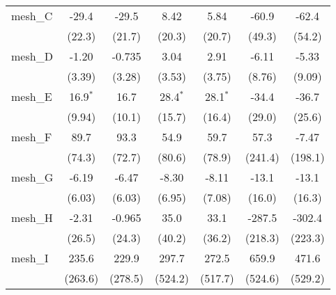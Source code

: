 \begin{tabular}{lcccccc}
   mesh\_C                                                     & -29.4         & -29.5       & 8.42           & 5.84          & -60.9        & -62.4\\   
                                                               & (22.3)        & (21.7)      & (20.3)         & (20.7)        & (49.3)       & (54.2)\\   
   mesh\_D                                                     & -1.20         & -0.735      & 3.04           & 2.91          & -6.11        & -5.33\\   
                                                               & (3.39)        & (3.28)      & (3.53)         & (3.75)        & (8.76)       & (9.09)\\   
   mesh\_E                                                     & 16.9$^{*}$    & 16.7        & 28.4$^{*}$     & 28.1$^{*}$    & -34.4        & -36.7\\   
                                                               & (9.94)        & (10.1)      & (15.7)         & (16.4)        & (29.0)       & (25.6)\\   
   mesh\_F                                                     & 89.7          & 93.3        & 54.9           & 59.7          & 57.3         & -7.47\\   
                                                               & (74.3)        & (72.7)      & (80.6)         & (78.9)        & (241.4)      & (198.1)\\   
   mesh\_G                                                     & -6.19         & -6.47       & -8.30          & -8.11         & -13.1        & -13.1\\   
                                                               & (6.03)        & (6.03)      & (6.95)         & (7.08)        & (16.0)       & (16.3)\\   
   mesh\_H                                                     & -2.31         & -0.965      & 35.0           & 33.1          & -287.5       & -302.4\\   
                                                               & (26.5)        & (24.3)      & (40.2)         & (36.2)        & (218.3)      & (223.3)\\   
   mesh\_I                                                     & 235.6         & 229.9       & 297.7          & 272.5         & 659.9        & 471.6\\   
                                                               & (263.6)       & (278.5)     & (524.2)        & (517.7)       & (524.6)      & (529.2)\\   

\end{tabular}
